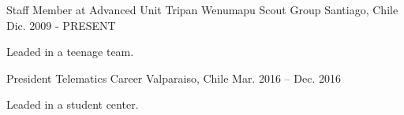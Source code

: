 

\begin{cventries}

  \cventry
    {Staff Member at Advanced Unit} %
    {Tripan Wenumapu Scout Group} %
    {Santiago, Chile} %
    {Dic. 2009 - PRESENT} %
    {
      \begin{cvitems} %
        \item {Leaded in a teenage team.}
      \end{cvitems}
    }

  \cventry
    {President} %
    {Telematics Career} %
    {Valparaiso, Chile} %
    {Mar. 2016 – Dec. 2016} %
    {
      \begin{cvitems} %
        \item {Leaded in a student center.}
      \end{cvitems}
    }

\end{cventries}
